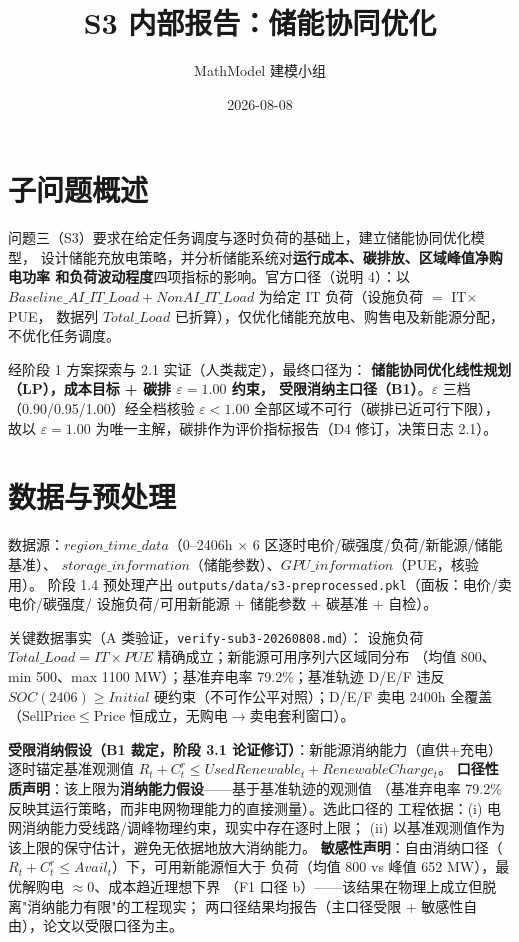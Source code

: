 \documentclass{internal-report}
\title{S3 内部报告：储能协同优化}
\author{MathModel 建模小组}
\date{2026-08-08}
\begin{document}
\maketitle

\section{子问题概述}

问题三（S3）要求在给定任务调度与逐时负荷的基础上，建立储能协同优化模型，
设计储能充放电策略，并分析储能系统对\textbf{运行成本、碳排放、区域峰值净购电功率
和负荷波动程度}四项指标的影响。官方口径（说明 4）：以
$Baseline\_AI\_IT\_Load + NonAI\_IT\_Load$ 为给定 IT 负荷（设施负荷 $=$ IT$\times$PUE，
数据列 $Total\_Load$ 已折算），仅优化储能充放电、购售电及新能源分配，不优化任务调度。

经阶段 1 方案探索与 2.1 实证（人类裁定），最终口径为：
\textbf{储能协同优化线性规划（LP），成本目标 + 碳排 $\varepsilon{=}1.00$ 约束，
受限消纳主口径（B1）}。$\varepsilon$ 三档（0.90/0.95/1.00）经全档核验
$\varepsilon<1.00$ 全部区域不可行（碳排已近可行下限），故以 $\varepsilon=1.00$
为唯一主解，碳排作为评价指标报告（D4 修订，决策日志 2.1）。

\section{数据与预处理}

数据源：$region\_time\_data$（0--2406h $\times$ 6 区逐时电价/碳强度/负荷/新能源/储能基准）、
$storage\_information$（储能参数）、$GPU\_information$（PUE，核验用）。
阶段 1.4 预处理产出 \texttt{outputs/data/s3-preprocessed.pkl}（面板：电价/卖电价/碳强度/
设施负荷/可用新能源 + 储能参数 + 碳基准 + 自检）。

关键数据事实（A 类验证，\texttt{verify-sub3-20260808.md}）：
设施负荷 $Total\_Load = IT\times PUE$ 精确成立；新能源可用序列六区域同分布
（均值 800、min 500、max 1100 MW）；基准弃电率 79.2\%；基准轨迹 D/E/F 违反
$SOC(2406)\ge Initial$ 硬约束（不可作公平对照）；D/E/F 卖电 2400h 全覆盖
（SellPrice$\le$Price 恒成立，无购电$\to$卖电套利窗口）。

\textbf{受限消纳假设（B1 裁定，阶段 3.1 论证修订）}：新能源消纳能力（直供+充电）
逐时锚定基准观测值 $R_t+C^r_t \le UsedRenewable_t+RenewableCharge_t$。
\textbf{口径性质声明}：该上限为\textbf{消纳能力假设}——基于基准轨迹的观测值
（基准弃电率 79.2\% 反映其运行策略，而非电网物理能力的直接测量）。选此口径的
工程依据：(i) 电网消纳能力受线路/调峰物理约束，现实中存在逐时上限；
(ii) 以基准观测值作为该上限的保守估计，避免无依据地放大消纳能力。
\textbf{敏感性声明}：自由消纳口径（$R_t+C^r_t\le Avail_t$）下，可用新能源恒大于
负荷（均值 800 vs 峰值 652 MW），最优解购电 $\approx 0$、成本趋近理想下界
（F1 口径 b）——该结果在物理上成立但脱离"消纳能力有限"的工程现实；
两口径结果均报告（主口径受限 + 敏感性自由），论文以受限口径为主。
\end{document}
